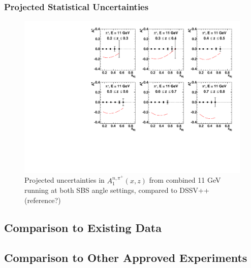\subsubsection{Projected Statistical Uncertainties}
\begin{figure}[h]
  \begin{center}
    \includegraphics[width=.98\textwidth]{figures/A1n_vs_x_E11_pip.pdf}
  \end{center}
  \caption{\label{A1n_pip_11gev.txt} Projected uncertainties in $A_1^{n,\pi^+}(x,z)$ from combined 11 GeV running at both SBS angle settings, compared to DSSV++ (reference?)}
\end{figure}
\subsection{Comparison to Existing Data}
\subsection{Comparison to Other Approved Experiments}

